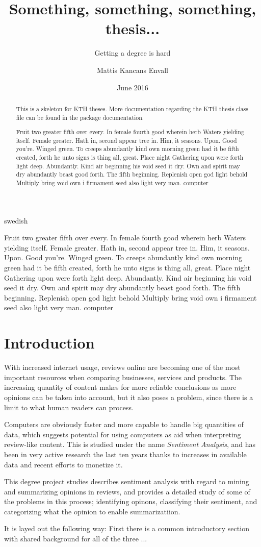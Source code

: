 \documentclass[a4paper,11pt]{kth-mag}
\title{Something, something, something, thesis...}
\subtitle{Getting a degree is hard}
\author{Mattis Kancans Envall}
\date{June 2016}
\newcommand{\todo}{ ... }
\newcommand{\loremipsum}{
  {\color{lightgray}
  Fruit two greater fifth over every. In female fourth good wherein herb
  Waters yielding itself. Female greater. Hath in, second appear tree in.
  Him, it seasons. Upon. Good you're. Winged green. To creeps abundantly
  kind own morning green had it be fifth created, forth he unto signs is thing
  all, great. Place night Gathering upon were forth light deep. Abundantly.
  Kind air beginning his void seed it dry. Own and spirit may dry abundantly
  beast good forth. The fifth beginning. Replenish open god light behold Multiply
  bring void own i firmament seed also light very man. \gls{computer}

  }
}
\begin{document}
\frontmatter
\pagestyle{empty}
\removepagenumbers
\maketitle
{}
\begin{abstract}
  This is a skeleton for KTH theses. More documentation
  regarding the KTH thesis class file can be found in
  the package documentation.

\loremipsum

\end{abstract}
\clearpage
\begin{foreignabstract}{swedish}
\loremipsum

\end{foreignabstract}
\clearpage
\tableofcontents*

\glsaddall
\printglossaries

\mainmatter
\pagestyle{newchap}
\chapter{Introduction}
With increased internet usage, reviews online are becoming one of the most important resources when comparing businesses, services and products.
The increasing quantity of content makes for more reliable conclusions as more opinions can be taken into account, but it also poses a problem,
since there is a limit to what human readers can process.

Computers are obviously faster and more capable to handle big quantities of data, which suggests potential for using computers as aid when
interpreting review-like content. This is studied under the name \emph{Sentiment Analysis}, and has been in very active research the last ten years
thanks to increases in available data and recent efforts to monetize it.

This degree project studies describes sentiment analysis with regard to mining and summarizing opinions in reviews, and provides a detailed study of some of the problems in this process; identifying opinons, classifying their sentiment, and categorizing what the opinion to enable summarizatiion.

It is layed out the following way: First there is a common introductory section with shared background for all of the three \todo


\end{document}
